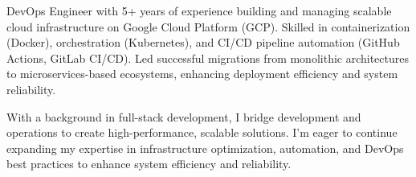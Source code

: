 DevOps Engineer with 5+ years of experience building and managing scalable cloud infrastructure on Google Cloud Platform (GCP). Skilled in containerization (Docker), orchestration (Kubernetes), and CI/CD pipeline automation (GitHub Actions, GitLab CI/CD). Led successful migrations from monolithic architectures to microservices-based ecosystems, enhancing deployment efficiency and system reliability.

\vspace{1em}

With a background in full-stack development, I bridge development and operations to create high-performance, scalable solutions. I'm eager to continue expanding my expertise in infrastructure optimization, automation, and DevOps best practices to enhance system efficiency and reliability.
